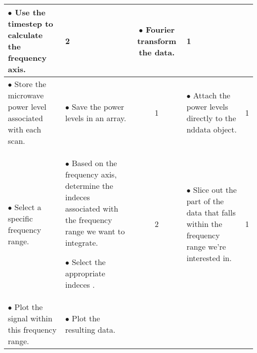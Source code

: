\begin{minipage}{\textwidth}
\begin{tabular}{p{}|p{}c|p{}c}
\begin{minipage}{0.3\textwidth}
                $\bullet$ Use the {\color{blue} timestep} to calculate the {\color{green} frequency axis}.
            \end{minipage}
            &
            2
            &
            \begin{minipage}{0.3\textwidth}
                $\bullet$ Fourier transform the {\color{red} data}.
            \end{minipage}
            &
            1
            \\ \hline
            \begin{minipage}{0.2\textwidth}
                $\bullet$ Store the microwave power level associated with each scan.
            \end{minipage}
            &
            \begin{minipage}{0.3\textwidth}
                $\bullet$ Save the {\color{violet} power levels } in an array. 
            \end{minipage}
            &
            1
            &
            \begin{minipage}{0.3\textwidth}
                $\bullet$ Attach the power levels directly to the {\color{red} nddata object}.
            \end{minipage}
            &
            1
            \\ \hline
            $\bullet$ Select a specific frequency range.
            &
            \begin{minipage}{0.3\textwidth}
                $\bullet$ Based on the {\color{green}frequency axis}, determine the {\color{orange} indeces} associated with the frequency range we want to integrate.

                $\bullet$ Select the appropriate {\color{orange} indeces }.
            \end{minipage}
            &
            2
            &
            \begin{minipage}{0.3\textwidth}
                $\bullet$ Slice out the part of the {\color{red} data} that falls within the frequency range we're interested in.
            \end{minipage}
            &
            1
            \\ \hline
            $\bullet$ Plot the signal within this frequency range. 
            &
            \begin{minipage}{0.3\textwidth}
                $\bullet$ Plot the resulting {\color{red} data}.


\end{minipage}
\end{tabular}
\end{minipage}
